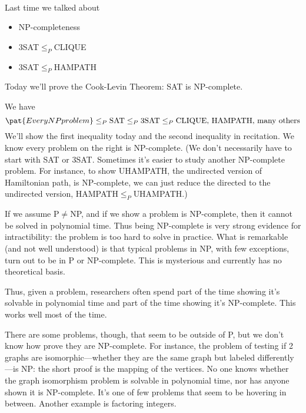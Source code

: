 \

Last time we talked about
\begin{itemize}
\item
NP-completeness
\item
3SAT$\le_P$CLIQUE
\item
3SAT$\le_P$HAMPATH
\end{itemize}
Today we'll prove the Cook-Levin Theorem: SAT is NP-complete.

We have
\[
\pat{Every NP problem}\le_P \text{SAT}\le_P 3\text{SAT}\le_P \text{CLIQUE},\,\text{HAMPATH},\,\text{many others}
\]
We'll show the first inequality today and the second inequality in recitation. We know every problem on the right is NP-complete. (We don't necessarily have to start with SAT or 3SAT. Sometimes it's easier to study another NP-complete problem. For instance, to show UHAMPATH, the undirected version of Hamiltonian path, is NP-complete, we can just reduce the directed to the undirected version, HAMPATH$\le_P$UHAMPATH.) %

If we assume P$\ne $NP, and if we show a problem is NP-complete, then it cannot be solved in polynomial time. 
Thus being NP-complete is very strong evidence for intractibility: the problem is too hard to solve in practice. What is remarkable (and not well understood) is that %
typical problems in NP, with few exceptions, turn out to be in P or NP-complete. This is mysterious and currently has no theoretical basis.

Thus, given a problem,  researchers often spend part of the time showing it's solvable in polynomial time and part of the time showing it's NP-complete. This works well most of the time.%

There are some problems, though, that seem to be outside of P, but we don't know how prove they are NP-complete. %
For instance, the problem of testing if 2 graphs are isomorphic---whether they are the same graph but labeled differently---is %
NP: the short proof is the mapping of the vertices. No one knows whether the graph isomorphism problem is solvable in polynomial time, nor has anyone shown it is NP-complete. It's one of few problems that seem to be hovering in between. Another example is factoring integers.

